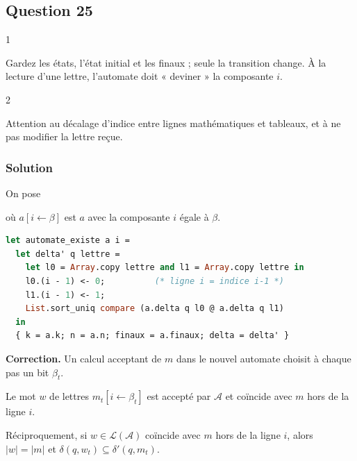 \documentclass[11pt,a4paper]{article}
\newcommand{\equationajustee}[1]{%
  \sbox{\boiteequation}{$\displaystyle #1$}%
  \ifdim\wd\boiteequation>\linewidth
    \[\resizebox{\linewidth}{!}{\usebox{\boiteequation}}\]%
  \else
    \[#1\]%
  \fi}
\begin{document}
\hypertarget{question-25}{%
\subsection{Question 25}\label{question-25}}

\begin{indication}{1}

Gardez les états, l'état initial et les finaux ; seule la transition change. À la lecture d'une lettre, l'automate doit « deviner » la composante \(i\).

\end{indication}

\begin{indication}{2}

Attention au décalage d'indice entre lignes mathématiques et tableaux, et à ne pas modifier la lettre reçue.

\end{indication}

\hypertarget{solution-24}{%
\subsubsection{Solution}\label{solution-24}}

On pose

\equationajustee{\delta'(q,a)=\delta(q,a[i\leftarrow0])\cup\delta(q,a[i\leftarrow1]),}

où \(a[i\leftarrow\beta]\) est \(a\) avec la composante \(i\) égale à \(\beta\).

\begin{lstlisting}[language=Caml]
let automate_existe a i =
  let delta' q lettre =
    let l0 = Array.copy lettre and l1 = Array.copy lettre in
    l0.(i - 1) <- 0;          (* ligne i = indice i-1 *)
    l1.(i - 1) <- 1;
    List.sort_uniq compare (a.delta q l0 @ a.delta q l1)
  in
  { k = a.k; n = a.n; finaux = a.finaux; delta = delta' }
\end{lstlisting}

\textbf{Correction.} Un calcul acceptant de \(m\) dans le nouvel automate choisit à chaque pas un bit \(\beta_t\).

Le mot \(w\) de lettres \(m_t[i\leftarrow\beta_t]\) est accepté par \(\mathcal{A}\) et coïncide avec \(m\) hors de la ligne \(i\).

Réciproquement, si \(w\in\mathcal{L}(\mathcal{A})\) coïncide avec \(m\) hors de la ligne \(i\), alors \(|w|=|m|\) et \(\delta(q,w_t)\subseteq\delta'(q,m_t)\).
\end{document}

